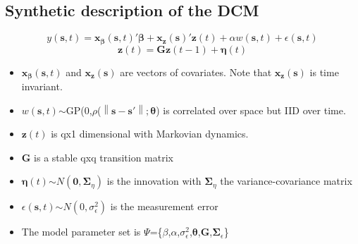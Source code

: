 \subsection{Synthetic description of the DCM}

\begin{displaymath}{y(\pmb{s},t)=\pmb{x_\beta}(\pmb{s},t)'\pmb{\beta}+\pmb{x_z}(\pmb{s})'\pmb{z}(t)+\alpha w(\pmb{s},t)+\epsilon(\pmb{s},t)}\end{displaymath}
\begin{displaymath}{\pmb{z}(t)=\pmb{Gz}(t-1)+\pmb{\eta}(t)}\end{displaymath}
\begin{itemize}
	\item \begin{math}{\pmb{x_\beta}(\pmb{s},t)}\end{math} and \begin{math}{ \pmb{x_z}(\pmb{s})}\end{math} are vectors of covariates. Note that \begin{math}{ \pmb{x_z}(\pmb{s})}\end{math} is time invariant.
	\item \begin{math}{w(\pmb{s},t)}\end{math}$\sim$GP(0,$\rho$(\begin{math}{ \left \| \pmb{s}-\pmb{s'} \right \|;\pmb{\theta}}\end{math}) is correlated over space but IID over time.
	\item \begin{math}{\pmb{z}(t)}\end{math} is qx1 dimensional with Markovian dynamics.
	\item \textbf{G} is a stable qxq transition matrix
	\item \begin{math}{\pmb{\eta}(t)}\end{math}$\sim$\begin{math}{\mathit{N}(\pmb{0},\pmb{\Sigma}_\eta)}\end{math} is the innovation with \begin{math}{\pmb{\Sigma}_\eta}\end{math} the variance-covariance matrix
	\item \begin{math}{\epsilon(\pmb{s},t)}\end{math}$\sim$\begin{math}{
			\mathit{N}(0,\sigma_\epsilon^2)}	\end{math} is the measurement error
	\item The model parameter set is $\Psi$=\{\textbf{$\beta$},$\alpha$,$\sigma_\epsilon^2$,$\pmb{\theta}$,$\pmb{G}$,$\pmb{\Sigma}_\epsilon$\}
\end{itemize}

